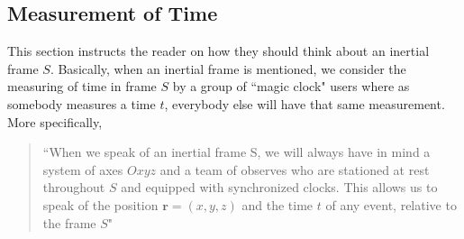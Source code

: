 \subsection{Measurement of Time}

This section instructs the reader on how they should think about an inertial frame $S$. Basically, when an inertial frame is mentioned, we consider the measuring of time in frame $S$ by a group of ``magic clock" users where as somebody measures a time $t$, everybody else will have that same measurement.
More specifically,
\begin{quote}
    ``When we speak of an inertial frame S, we will always have in mind a system of axes $Oxyz$ and a team of observes who are stationed at rest throughout $S$ and equipped with synchronized clocks. This allows us to speak of the position $\textbf{r} = (x,y,z)$ and the time $t$ of any event, relative to the frame $S$"
\end{quote}